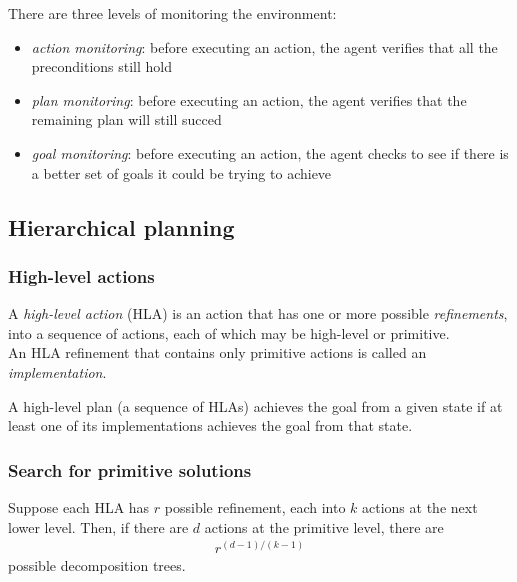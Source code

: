 \documentclass{article}
\begin{document}
\begin{definition}[R\&N p. 423]
	There are three levels of monitoring the environment:
	\begin{itemize}
		\item \emph{action monitoring}: before executing an action, the agent verifies that
		      all the preconditions still hold
		\item \emph{plan monitoring}: before executing an action, the agent verifies that the
		      remaining plan will still succed
		\item \emph{goal monitoring}: before executing an action, the agent checks to see
		      if there is a better set of goals it could be trying to achieve
	\end{itemize}
\end{definition}

\subsection{Hierarchical planning}

\subsubsection{High-level actions}

\begin{definition}[HLA, R\&N p. 406]
	A \emph{high-level action} (HLA) is an action that has one or more possible
	\emph{refinements}, into a sequence of actions, each of which may be high-level
	or primitive.\\
	An HLA refinement that contains only primitive actions is called an
	\emph{implementation}.
\end{definition}

\begin{definition}[R\&N p. 407]
	A high-level plan (a sequence of HLAs) achieves the goal from a given state
	if at least one of its implementations achieves the goal from that state.
\end{definition}

\subsubsection{Search for primitive solutions}

\begin{theorem}[R\&N p. 409]
	Suppose each HLA has $r$ possible refinement, each into $k$ actions at the
	next lower level. Then, if there are $d$ actions at the primitive level,
	there are
	\begin{align*}
		r^{(d-1)/(k-1)}
	\end{align*}
	possible decomposition trees.
\end{theorem}
\end{document}
